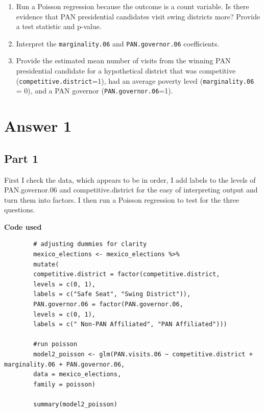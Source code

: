 \documentclass[12pt,letterpaper]{article}
\begin{document}
	\begin{enumerate}
		\item [(a)]
		Run a Poisson regression because the outcome is a count variable. Is there evidence that PAN presidential candidates visit swing districts more? Provide a test statistic and p-value.
		
		\item [(b)]
		Interpret the \texttt{marginality.06} and \texttt{PAN.governor.06} coefficients.
		
		\item [(c)]
		Provide the estimated mean number of visits from the winning PAN presidential candidate for a hypothetical district that was competitive (\texttt{competitive.district}=1), had an average poverty level (\texttt{marginality.06} = 0), and a PAN governor (\texttt{PAN.governor.06}=1).
		
	\end{enumerate}
	
	
	
	\newpage
	\section*{Answer 1}
	\vspace{.25cm}
	
	\subsection{Part 1}
	First I check the data, which appears to be in order, I add labels to the levels of PAN.governor.06 and competitive.district for the easy of interpreting output and turn them into factors. I then run a Poisson regression to test for the three questions.
	
	\textbf{Code used}
	\begin{verbatim}
		# adjusting dummies for clarity
		mexico_elections <- mexico_elections %>%
		mutate(
		competitive.district = factor(competitive.district, 
		levels = c(0, 1), 
		labels = c("Safe Seat", "Swing District")),
		PAN.governor.06 = factor(PAN.governor.06, 
		levels = c(0, 1), 
		labels = c(" Non-PAN Affiliated", "PAN Affiliated")))
		
		#run poisson
		model2_poisson <- glm(PAN.visits.06 ~ competitive.district + marginality.06 + PAN.governor.06,
		data = mexico_elections,
		family = poisson)
		
		summary(model2_poisson)
	\end{verbatim}
	
\end{document}
